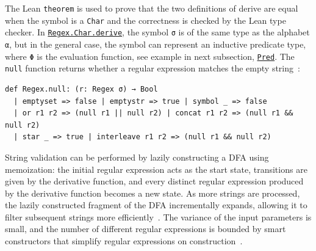 \documentclass[acmsmall,%
  screen,%
  authorversion, %
  nonacm%
]{acmart}
\newcommand{\link}[2]{\mbox{\hyperref[#2]{\lstinline{#1}}}\xspace}
\newcommand{\RegexCharDerive}{\link{Regex.Char.derive}{def Regex.Char.derive}}
\newcommand{\AnyEqPred}{\link{Pred}{AnyEqPred}}
\newcommand{\DFA}{\ac{DFA}\xspace}
\begin{document}
The Lean \lstinline{theorem} is used to prove that the two definitions of derive are equal when the symbol is a \lstinline{Char} and the correctness is checked by the Lean type checker.
In \RegexCharDerive, the symbol \lstinline{σ} is of the same type as the alphabet \lstinline{α}, but in the general case, the symbol can represent an inductive predicate type, where \lstinline{Φ} is the evaluation function, see example in next subsection, \AnyEqPred.
The \lstinline{null} function returns whether a regular expression matches the empty string~\cite{brzozowski1964derivatives, elliott2021symbolic, reexamined}:
\begin{lstlisting}[label=def Regex.null]
def Regex.null: (r: Regex σ) → Bool
  | emptyset => false | emptystr => true | symbol _ => false
  | or r1 r2 => (null r1 || null r2) | concat r1 r2 => (null r1 && null r2)
  | star _ => true | interleave r1 r2 => (null r1 && null r2)
\end{lstlisting}
String validation can be performed by lazily constructing a \DFA using memoization: the initial regular expression acts as the start state, transitions are given by the derivative function, and every distinct regular expression produced by the derivative function becomes a new state. 
As more strings are processed, the lazily constructed fragment of the \DFA incrementally expands, allowing it to filter subsequent strings more efficiently~\cite{reexamined}.
The variance of the input parameters is small, and the number of different regular expressions is bounded by smart constructors that simplify regular expressions on construction~\cite{reexamined}.
\end{document}
